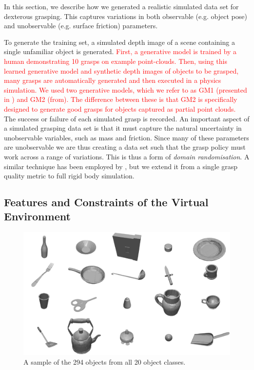 In this section, we describe how we generated a realistic simulated data set for dexterous grasping. This captures variations in both observable (e.g. object pose) and unobservable (e.g. surface friction) parameters.

To generate the training set, a simulated depth image of a scene containing a single unfamiliar object is generated. \textcolor{red}{First, a generative model is trained by a human demonstrating 10 grasps on example point-clouds. Then, using this learned generative model and synthetic depth images of objects to be grasped, many grasps are automatically generated and then executed in a physics simulation. We used two generative models, which we refer to as GM1 (presented in \cite{kopicki2015ijrr}) and GM2 (from\cite{kopicki2019ijrr}). The difference between these is that GM2 is specifically designed to generate good grasps for objects captured as partial point clouds.} The success or failure of each simulated grasp is recorded. An important aspect of a simulated grasping data set is that it must capture the natural uncertainty in unobservable variables, such as mass and friction. Since many of these parameters are unobservable we are thus creating a data set such that the grasp policy must work across a range of variations. This is thus a form of {\em domain randomisation}. A similar technique has been employed by \cite{mahler2017dex}, but we extend it from a single grasp quality metric to full rigid body simulation.

\subsection{Features and Constraints of the Virtual Environment}
\label{subsection:environment}

\begin{figure}[t]
\begin{center}
  \includegraphics[width=0.7\columnwidth]{images/allObjects-small.pdf}
  \end{center}
  \caption{A sample of the 294 objects from all 20 object classes.
  \label{fig:allObjects}}
\end{figure}

